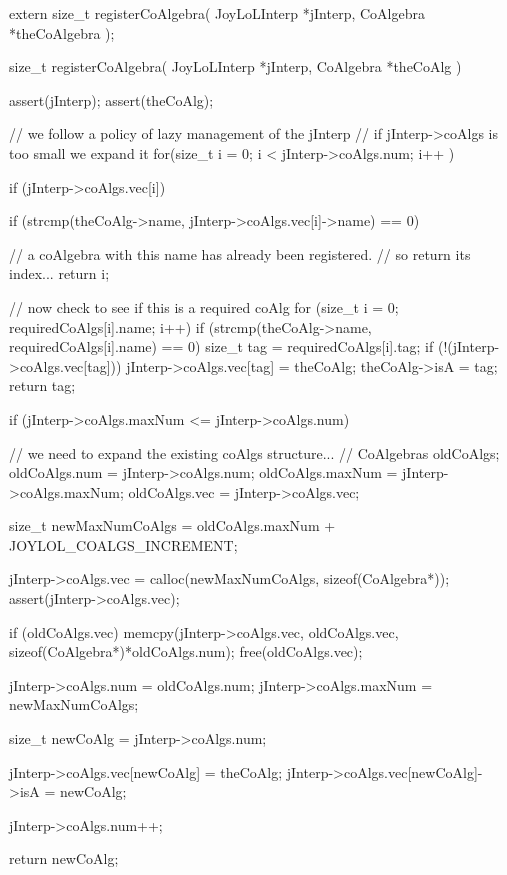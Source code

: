 \startTestSuite[registerCoAlgebra]

\startCHeader
extern size_t registerCoAlgebra(
  JoyLoLInterp *jInterp,
  CoAlgebra *theCoAlgebra
);
\stopCHeader

\startCCode
size_t registerCoAlgebra(
  JoyLoLInterp *jInterp,
  CoAlgebra *theCoAlg
) {
  assert(jInterp);
  assert(theCoAlg);

  // we follow a policy of lazy management of the jInterp
  // if jInterp->coAlgs is too small we expand it
  for(size_t i = 0; i < jInterp->coAlgs.num; i++ ) {
    if (jInterp->coAlgs.vec[i]) {
      if (strcmp(theCoAlg->name,
        jInterp->coAlgs.vec[i]->name) == 0) {
    
        // a coAlgebra with this name has already been registered. 
        // so return its index...
        return i;
      }
    }
  }

  // now check to see if this is a required coAlg
  for (size_t i = 0; requiredCoAlgs[i].name; i++) {
    if (strcmp(theCoAlg->name, requiredCoAlgs[i].name) == 0) {
      size_t tag = requiredCoAlgs[i].tag;
      if (!(jInterp->coAlgs.vec[tag])) {
        jInterp->coAlgs.vec[tag] = theCoAlg;
        theCoAlg->isA = tag;
      }
      return tag;
    }
  }
  
  if (jInterp->coAlgs.maxNum <= jInterp->coAlgs.num) {
    // we need to expand the existing coAlgs structure...
    //  
    CoAlgebras oldCoAlgs;
    oldCoAlgs.num    = jInterp->coAlgs.num;
    oldCoAlgs.maxNum = jInterp->coAlgs.maxNum;
    oldCoAlgs.vec    = jInterp->coAlgs.vec;
    
    size_t newMaxNumCoAlgs =
      oldCoAlgs.maxNum + JOYLOL_COALGS_INCREMENT;

    jInterp->coAlgs.vec =
      calloc(newMaxNumCoAlgs, sizeof(CoAlgebra*));
    assert(jInterp->coAlgs.vec);
    
    if (oldCoAlgs.vec) {
      memcpy(jInterp->coAlgs.vec,
        oldCoAlgs.vec,
        sizeof(CoAlgebra*)*oldCoAlgs.num);
      free(oldCoAlgs.vec);
    }
    
    jInterp->coAlgs.num    = oldCoAlgs.num;
    jInterp->coAlgs.maxNum = newMaxNumCoAlgs;
  }
  
  size_t newCoAlg = jInterp->coAlgs.num;
  
  jInterp->coAlgs.vec[newCoAlg]      = theCoAlg;
  jInterp->coAlgs.vec[newCoAlg]->isA = newCoAlg;
  
  jInterp->coAlgs.num++;
  
  return newCoAlg;
}
\stopCCode

